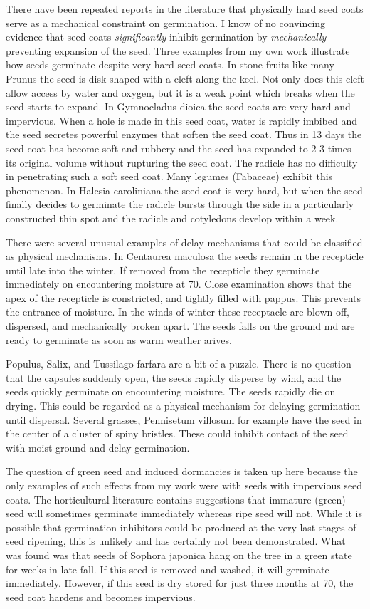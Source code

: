 There have been repeated reports in the literature that physically hard seed
coats serve as a mechanical constraint on germination. I know of no convincing
evidence that seed coats \textit{significantly} inhibit germination by \textit{mechanically} preventing
expansion of the seed. Three examples from my own work illustrate how seeds
germinate despite very hard seed coats. In stone fruits like many Prunus the seed is
disk shaped with a cleft along the keel. Not only does this cleft allow access by water
and oxygen, but it is a weak point which breaks when the seed starts to expand. In
Gymnocladus dioica the seed coats are very hard and impervious. When a hole is
made in this seed coat, water is rapidly imbibed and the seed secretes powerful
enzymes that soften the seed coat. Thus in 13 days the seed coat has become soft
and rubbery and the seed has expanded to 2-3 times its original volume without
rupturing the seed coat. The radicle has no difficulty in penetrating such a soft seed
coat. Many legumes (Fabaceae) exhibit this phenomenon. In Halesia caroliniana the
seed coat is very hard, but when the seed finally decides to germinate the radicle
bursts through the side in a particularly constructed thin spot and the radicle and
cotyledons develop within a week.

There were several unusual examples of delay mechanisms that could be
classified as physical mechanisms. In Centaurea maculosa the seeds remain in the
recepticle until late into the winter. If removed from the recepticle they germinate
immediately on encountering moisture at 70. Close examination shows that the apex
of the recepticle is constricted, and tightly filled with pappus. This prevents the
entrance of moisture. In the winds of winter these receptacle are blown off, dispersed,
and mechanically broken apart. The seeds falls on the ground md are ready to
germinate as soon as warm weather arives.

Populus, Salix, and Tussilago farfara are a bit of a puzzle. There is no question
that the capsules suddenly open, the seeds rapidly disperse by wind, and the seeds
quickly germinate on encountering moisture. The seeds rapidly die on drying. This
could be regarded as a physical mechanism for delaying germination until dispersal.
Several grasses, Pennisetum villosum for example have the seed in the center
of a cluster of spiny bristles. These could inhibit contact of the seed with moist ground
and delay germination.

The question of green seed and induced dormancies is taken up here because
the only examples of such effects from my work were with seeds with impervious seed
coats. The horticultural literature contains suggestions that immature (green) seed will
sometimes germinate immediately whereas ripe seed will not. While it is possible that
germination inhibitors could be produced at the very last stages of seed ripening, this
is unlikely and has certainly not been demonstrated. What was found was that seeds
of Sophora japonica hang on the tree in a green state for weeks in late fall. If this seed
is removed and washed, it will germinate immediately. However, if this seed is dry
stored for just three months at 70, the seed coat hardens and becomes impervious.

